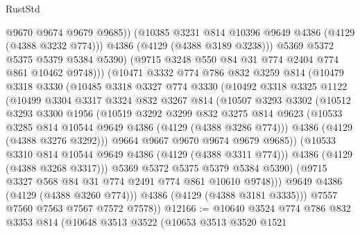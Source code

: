\begin{lexlean}{RustStd}
\begin{coremodule}
{\begin{coremodule}
{{{{{{{{{{{{{{                      @9670
                      @9674
                      @9679
                      @9685))
                  (@10385 @3231 @814 @10396 @9649 @4386 (@4129 (@4388 @3232 @774)))
                  @4386
                  (@4129 (@4388 @3189 @3238)))
                @5369
                @5372
                @5375
                @5379
                @5384
                @5390)
              (@9715 @3248 @550 @84 @31 @774 @2404 @774 @861 @10462 @9748)))
          (@10471
            @3332
            @774
            @786
            @832
            @3259
            @814
            (@10479
              @3318
              @3330
              (@10485
                @3318
                @3327
                @774
                @3330
                (@10492
                  @3318
                  @3325
                  @1122
                  (@10499
                    @3304
                    @3317
                    @3324
                    @832
                    @3267
                    @814
                    (@10507
                      @3293
                      @3302
                      (@10512
                        @3293
                        @3300
                        @1956
                        (@10519
                          @3292
                          @3299
                          @832
                          @3275
                          @814
                          @9623
                          (@10533 @3285 @814 @10544 @9649 @4386 (@4129 (@4388 @3286 @774)))
                          @4386
                          (@4129 (@4388 @3276 @3292)))
                        @9664
                        @9667
                        @9670
                        @9674
                        @9679
                        @9685))
                    (@10533 @3310 @814 @10544 @9649 @4386 (@4129 (@4388 @3311 @774)))
                    @4386
                    (@4129 (@4388 @3268 @3317)))
                  @5369
                  @5372
                  @5375
                  @5379
                  @5384
                  @5390)
                (@9715 @3327 @568 @84 @31 @774 @2491 @774 @861 @10610 @9748)))
            @9649
            @4386
            (@4129 (@4388 @3260 @774)))
          @4386
          (@4129 (@4388 @3181 @3335)))
        @7557
        @7560
        @7563
        @7567
        @7572
        @7578))
@12166 := @10640
    @3524
    @774
    @786
    @832
    @3353
    @814
    (@10648
      @3513
      @3522
      (@10653
        @3513
        @3520
        @1521
}}}}}}}}}}}}}}
\end{coremodule}}
\end{coremodule}
\end{lexlean}
